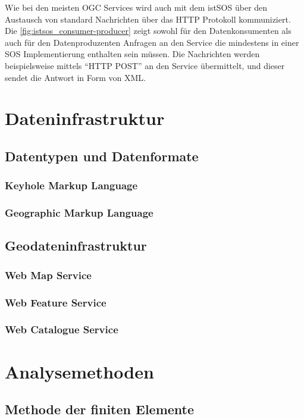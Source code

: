 Wie bei den meisten \gls{OGC} Services wird auch mit dem \gls{istSOS} über den Austausch von standard Nachrichten über das \gls{HTTP} Protokoll kommuniziert. Die  \ref{fig:istsos_consumer-producer} zeigt sowohl für den Datenkonsumenten als auch für den Datenproduzenten Anfragen an den Service die mindestens in einer \gls{SOS} Implementierung enthalten sein müssen. Die Nachrichten werden beispielsweise mittels ``HTTP POST'' an den Service übermittelt, und dieser sendet die Antwort in Form von \gls{XML}. 

\section{Dateninfrastruktur}
\subsection{Datentypen und Datenformate}
\subsubsection{Keyhole Markup Language}
\subsubsection{Geographic Markup Language}
\subsection{Geodateninfrastruktur}
\subsubsection{Web Map Service}
\subsubsection{Web Feature Service}
\subsubsection{Web Catalogue Service}

\section{Analysemethoden}
\subsection{Methode der finiten Elemente}
